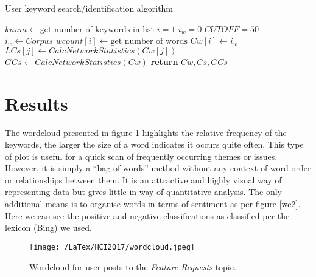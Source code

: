 \documentclass{ewic}
\begin{document}
\begin{algorithm}
\caption{User keyword search/identification algorithm}\label{alg1}
\begin{algorithmic}[1]
\scriptsize
{}
   \State $knum \gets \mbox {get number of keywords in list}$
   \State$i = 1$
   \State$i_w =0$
   \State$CUTOFF =50$
      \\
           \State \textit{$i_w \gets Corpus$}
           \State \texttt{$wcount[i] \gets \mbox{get number of words}$}
            \State \texttt{$Cw[i] \gets i_w$}
            \EndIf
                   \State \textit{$LCs[j] \gets CalcNetworkStatistics(Cw[j])$  }
                \EndFor
      \EndFor  
    \State \textit{$GCs \gets CalcNetworkStatistics(Cw)$  }  
   \State \textbf{return} $Cw, Cs, GCs$
\EndProcedure
\normalsize
\end{algorithmic}
\end{algorithm}



\section{Results}
The wordcloud presented in figure \ref{wc1} highlights the relative frequency of the keywords, the larger the size of a word indicates it occurs quite often.  This type of plot is useful for a quick scan of frequently occurring themes or issues. However, it is simply a ``bag of words'' method without any context of word order or relationships between them. It is an attractive and highly visual way of representing data but gives little in way of quantitative analysis. The only additional means is to organise words in terms of sentiment as per figure \ref{wc2}. Here we can see the positive and negative classifications as classified per the lexicon (Bing) we used.

\begin{figure}[h]
  \begin{center}
\texttt{[image: /LaTex/HCI2017/wordcloud.jpeg]} %
  \end{center}
 \caption{Wordcloud for user posts to the {\it Feature Requests } topic.}
\label{wc1}
\end{figure}
\end{document}
